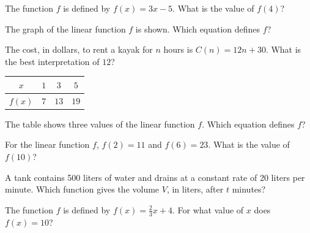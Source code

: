 \begin{exo}{}
The function $f$ is defined by $f(x)=3x-5$. What is the value of $f(4)$?
\end{exo}
\begin{exo}{}
The graph of the linear function $f$ is shown. Which equation defines $f$?
\end{exo}
\begin{exo}{}
The cost, in dollars, to rent a kayak for $n$ hours is $C(n)=12n+30$. What is the best interpretation of $12$?
\end{exo}
\begin{exo}{}
\begin{center}\begin{tabular}{c|ccc}$x$&$1$&$3$&$5$\\\hline$f(x)$&$7$&$13$&$19$\end{tabular}\end{center}
The table shows three values of the linear function $f$. Which equation defines $f$?
\end{exo}
\begin{exo}{\sprtag}
For the linear function $f$, $f(2)=11$ and $f(6)=23$. What is the value of $f(10)$?
\end{exo}
\begin{exo}{}
A tank contains 500 liters of water and drains at a constant rate of 20 liters per minute. Which function gives the volume $V$, in liters, after $t$ minutes?
\end{exo}
\begin{exo}{}
The function $f$ is defined by $f(x)=\frac23x+4$. For what value of $x$ does $f(x)=10$?
\end{exo}
